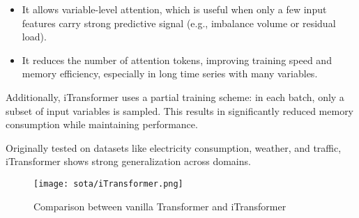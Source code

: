 \documentclass[class=scrbook, crop=false]{standalone}
\begin{document}
\begin{itemize}
\item It allows variable-level attention, which is useful when only a few input features carry strong predictive signal (e.g., imbalance volume or residual load).
\item It reduces the number of attention tokens, improving training speed and memory efficiency, especially in long time series with many variables.
\end{itemize}

Additionally, iTransformer uses a partial training scheme: in each batch, only a subset of input variables is sampled. This results in significantly reduced memory consumption while maintaining performance.

Originally tested on datasets like electricity consumption, weather, and traffic, iTransformer shows strong generalization across domains. 


\begin{figure}[ht]
            \centering
            \texttt{[image: sota/iTransformer.png]}
            \caption[Comparison between vanilla Transformer and iTransformer \cite{liuITransformerInvertedTransformers2023}]{Comparison between vanilla Transformer and iTransformer \cite{liuITransformerInvertedTransformers2023}}
            \label{fig::iTransformer}
 \end{figure}
 
\end{document}
